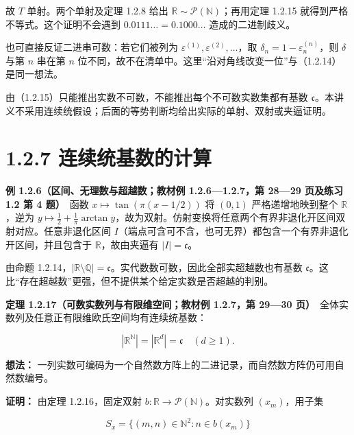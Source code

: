 \documentclass[11pt,a4paper]{article}
\begin{document}
故 \(T\) 单射。两个单射及定理 1.2.8 给出
\(\mathbb R\sim\mathcal P(\mathbb N)\)；再用定理 1.2.15
就得到严格不等式。这个证明不会遇到 \(0.0111\ldots=0.1000\ldots\)
造成的二进制歧义。

也可直接反证二进串可数：若它们被列为
\(\varepsilon^{(1)},\varepsilon^{(2)},\ldots\)，取
\(\delta_n=1-\varepsilon_n^{(n)}\)，则 \(\delta\) 与第 \(n\) 串在第
\(n\)
位不同，故不在清单中。这里``沿对角线改变一位''与（1.2.14）是同一想法。

由（1.2.15）只能推出实数不可数，不能推出每个不可数实数集都有基数
\(\mathfrak c\)。本讲义不采用连续统假设；后面的等势判断均给出实际的单射、双射或夹逼证明。

\section[\S{}1.2.7
连续统基数的计算]{1.2.7
连续统基数的计算}\label{ux8fdeux7eedux7edfux57faux6570ux7684ux8ba1ux7b97}

\textbf{例 1.2.6（区间、无理数与超越数；教材例 1.2.6---1.2.7，第 28---29
页及练习 1.2 第 4 题）}　函数 \(x\mapsto\tan(\pi(x-1/2))\) 将 \((0,1)\)
严格递增地映到整个 \(\mathbb R\)，逆为
\(y\mapsto\frac12+\frac1\pi\arctan y\)，故为双射。仿射变换将任意两个有界非退化开区间双射对应。任意非退化区间
\(I\)（端点可含可不含，也可无界）都包含一个有界非退化开区间，并且包含于
\(\mathbb R\)，故由夹逼有 \(|I|=\mathfrak c\)。

由命题
1.2.14，\(|\mathbb R\setminus\mathbb Q|=\mathfrak c\)。实代数数可数，因此全部实超越数也有基数
\(\mathfrak c\)。这比``存在超越数''更强，但不提供某个给定实数是否超越的判别。

\textbf{定理 1.2.17（可数实数列与有限维空间；教材例 1.2.7，第 29---30
页）}　全体实数列及任意正有限维欧氏空间均有连续统基数：

\begin{equation*}
|\mathbb R^{\mathbb N}|=|\mathbb R^d|=\mathfrak c\quad(d\ge1).
\tag{1.2.19}
\end{equation*}

\textbf{想法：}
一列实数可编码为一个自然数方阵上的二进记录，而自然数方阵仍可用自然数编号。

\textbf{证明：} 由定理 1.2.16，固定双射
\(b:\mathbb R\to\mathcal P(\mathbb N)\)。对实数列 \((x_m)\)，用子集

\begin{equation*}
S_x=\{(m,n)\in\mathbb N^2:n\in b(x_m)\}
\tag{1.2.20}
\end{equation*}
\end{document}
